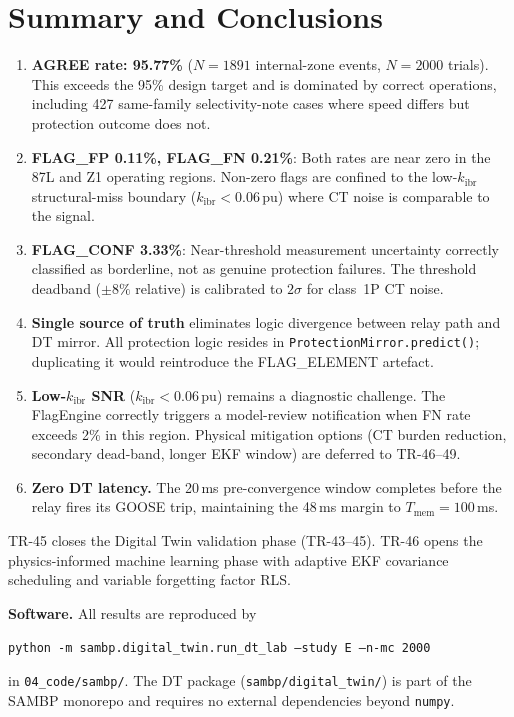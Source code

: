 \documentclass[11pt,a4paper]{article}
\newcommand{\kibr}{k_\mathrm{ibr}}
\begin{document}
\section{Summary and Conclusions}
\label{sec:summary}

\begin{enumerate}
  \item \textbf{AGREE rate: 95.77\%} ($N=1891$ internal-zone events, $N=2000$
    trials).  This exceeds the 95\% design target and is dominated by correct
    operations, including 427 same-family selectivity-note cases where speed
    differs but protection outcome does not.

  \item \textbf{FLAG\_FP 0.11\%, FLAG\_FN 0.21\%}: Both rates are near zero in
    the 87L and Z1 operating regions.  Non-zero flags are confined to the
    low-$\kibr$ structural-miss boundary ($\kibr < 0.06$\,pu) where CT noise
    is comparable to the signal.

  \item \textbf{FLAG\_CONF 3.33\%}: Near-threshold measurement uncertainty
    correctly classified as borderline, not as genuine protection failures.
    The threshold deadband ($\pm8\%$ relative) is calibrated to $2\sigma$
    for class~1P CT noise.

  \item \textbf{Single source of truth} eliminates logic divergence between
    relay path and DT mirror.  All protection logic resides in
    \texttt{ProtectionMirror.predict()}; duplicating it would reintroduce the
    FLAG\_ELEMENT artefact.

  \item \textbf{Low-$\kibr$ SNR} ($\kibr < 0.06$\,pu) remains a diagnostic
    challenge.  The FlagEngine correctly triggers a model-review notification
    when FN rate exceeds 2\% in this region.  Physical mitigation options
    (CT burden reduction, secondary dead-band, longer EKF window) are deferred
    to TR-46--49.

  \item \textbf{Zero DT latency.}  The 20\,ms pre-convergence window completes
    before the relay fires its GOOSE trip, maintaining the 48\,ms margin to
    $T_\mathrm{mem} = 100$\,ms.
\end{enumerate}

\noindent
TR-45 closes the Digital Twin validation phase (TR-43--45).  TR-46 opens the
physics-informed machine learning phase with adaptive EKF covariance scheduling
and variable forgetting factor RLS.

\bigskip

\noindent\textbf{Software.}
All results are reproduced by
\begin{center}
  \texttt{python -m sambp.digital\_twin.run\_dt\_lab --study E --n-mc 2000}
\end{center}
in \texttt{04\_code/sambp/}.  The DT package (\texttt{sambp/digital\_twin/})
is part of the SAMBP monorepo and requires no external dependencies beyond
\texttt{numpy}.



\end{document}
